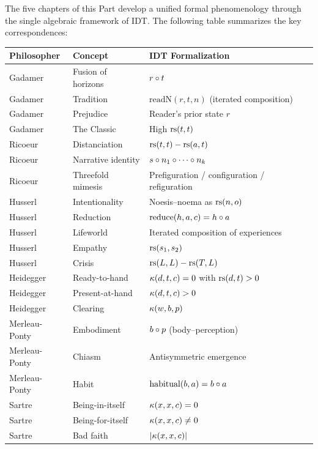 \begin{remark}
\label{rem:concordance-final}
The five chapters of this Part develop a unified formal phenomenology through
the single algebraic framework of IDT.  The following table summarizes
the key correspondences:

\begin{center}
\begin{tabular}{lll}
\textbf{Philosopher} & \textbf{Concept} & \textbf{IDT Formalization} \\ \hline
Gadamer & Fusion of horizons & $r \circ t$ \\
Gadamer & Tradition & $\mathrm{readN}(r, t, n)$ (iterated composition) \\
Gadamer & Prejudice & Reader's prior state $r$ \\
Gadamer & The Classic & High $\mathrm{rs}(t, t)$ \\
Ricoeur & Distanciation & $\mathrm{rs}(t,t) - \mathrm{rs}(a,t)$ \\
Ricoeur & Narrative identity & $s \circ n_1 \circ \cdots \circ n_k$ \\
Ricoeur & Threefold mimesis & Prefiguration / configuration / refiguration \\
Husserl & Intentionality & Noesis--noema as $\mathrm{rs}(n, o)$ \\
Husserl & Reduction & $\mathrm{reduce}(h, a, c) = h \circ a$ \\
Husserl & Lifeworld & Iterated composition of experiences \\
Husserl & Empathy & $\mathrm{rs}(s_1, s_2)$ \\
Husserl & Crisis & $\mathrm{rs}(L, L) - \mathrm{rs}(T, L)$ \\
Heidegger & Ready-to-hand & $\kappa(d, t, c) = 0$ with $\mathrm{rs}(d, t) > 0$ \\
Heidegger & Present-at-hand & $\kappa(d, t, c) > 0$ \\
Heidegger & Clearing & $\kappa(w, b, p)$ \\
Merleau-Ponty & Embodiment & $b \circ p$ (body--perception) \\
Merleau-Ponty & Chiasm & Antisymmetric emergence \\
Merleau-Ponty & Habit & $\mathrm{habitual}(b, a) = b \circ a$ \\
Sartre & Being-in-itself & $\kappa(x, x, c) = 0$ \\
Sartre & Being-for-itself & $\kappa(x, x, c) \neq 0$ \\
Sartre & Bad faith & $|\kappa(x, x, c)|$ \\

\end{tabular}
\end{center}
\end{remark}

